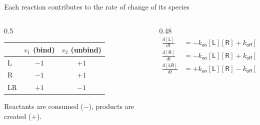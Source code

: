 \documentclass[aspectratio=169,10pt,t]{beamer}
\newcommand{\conc}[1]{[\mathsf{#1}]}
\begin{document}
\begin{frame}{Each reaction contributes to the rate of change of its species}
  \begin{columns}[c]
    \begin{column}{0.5\textwidth}
      \centering
      \begin{tabular}{lcc}
        \toprule
        & $v_1$ (bind) & $v_2$ (unbind) \\
        \midrule
        L  & $-1$ & $+1$ \\
        R  & $-1$ & $+1$ \\
        LR & $+1$ & $-1$ \\
        \bottomrule
      \end{tabular}
      \vskip3mm
      {\small Reactants are consumed ($-$), products are created ($+$).}
    \end{column}
    \begin{column}{0.48\textwidth}
      \begin{align*}
        \frac{d\conc{L}}{dt}  &= -k_\mathsf{on}\conc{L}\conc{R} + k_\mathsf{off}\conc{LR}\\[1mm]
        \frac{d\conc{R}}{dt}  &= -k_\mathsf{on}\conc{L}\conc{R} + k_\mathsf{off}\conc{LR}\\[1mm]
        \frac{d\conc{LR}}{dt} &= +k_\mathsf{on}\conc{L}\conc{R} - k_\mathsf{off}\conc{LR}
      \end{align*}
    \end{column}
  \end{columns}
\end{frame}
\end{document}
